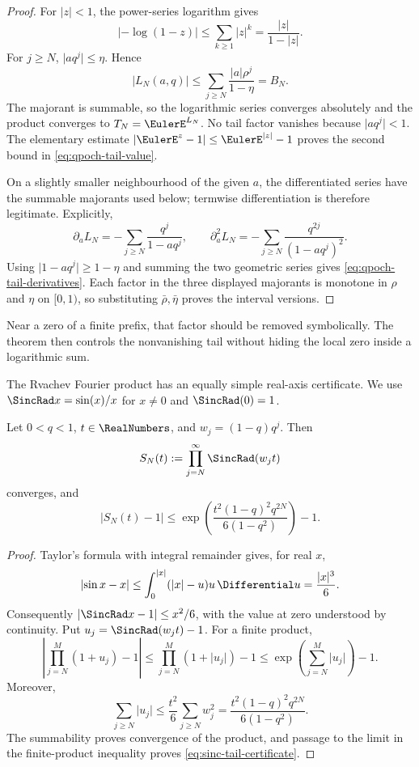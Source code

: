 \begin{proof}
For \(\lvert z\rvert<1\), the power-series logarithm gives
\[
 \left\lvert-\log(1-z)\right\rvert
 \le\sum_{k\ge1}\lvert z\rvert^k
 =\frac{\lvert z\rvert}{1-\lvert z\rvert}.
\]
For \(j\ge N\), \(\lvert aq^j\rvert\le\eta\).  Hence
\[
 \lvert L_N(a,q)\rvert
 \le \sum_{j\ge N}\frac{\lvert a\rvert\rho^j}{1-\eta}
 =B_N.
\]
The majorant is summable, so the logarithmic series converges absolutely and
the product converges to \(T_N=\EulerE^{L_N}\).  No tail factor vanishes because
\(\lvert aq^j\rvert<1\).  The elementary estimate
\(\lvert\EulerE^z-1\rvert\le\EulerE^{\lvert z\rvert}-1\) proves the second bound in
\eqref{eq:qpoch-tail-value}.

On a slightly smaller neighbourhood of the given \(a\), the differentiated
series have the summable majorants used below; termwise differentiation is
therefore legitimate.  Explicitly,
\[
 \partial_aL_N=-\sum_{j\ge N}\frac{q^j}{1-aq^j},
 \qquad
 \partial_a^2L_N=-\sum_{j\ge N}\frac{q^{2j}}{(1-aq^j)^2}.
\]
Using \(\lvert1-aq^j\rvert\ge1-\eta\) and summing the two geometric series
gives \eqref{eq:qpoch-tail-derivatives}.  Each factor in the three displayed
majorants is monotone in \(\rho\) and \(\eta\) on \([0,1)\), so substituting
\(\bar\rho,\bar\eta\) proves the interval versions.
\end{proof}

Near a zero of a finite prefix, that factor should be removed symbolically.
The theorem then controls the nonvanishing tail without hiding the local zero
inside a logarithmic sum.

The Rvachev Fourier product has an equally simple real-axis certificate.  We
use \(\SincRad x=\sin(x)/x\) for \(x\ne0\) and \(\SincRad(0)=1\).

\begin{theorem}
\label{thm:sinc-tail-certificate}
Let \(0<q<1\), \(t\in\RealNumbers\), and \(w_j=(1-q)q^j\).  Then
\[
 S_N(t):=\prod_{j=N}^{\infty}\SincRad(w_jt)
\]
converges, and
\begin{equation}
 \lvert S_N(t)-1\rvert
 \le \exp\!\left(
   \frac{t^2(1-q)^2q^{2N}}{6(1-q^2)}
 \right)-1.
 \label{eq:sinc-tail-certificate}
\end{equation}
\end{theorem}

\begin{proof}
Taylor's formula with integral remainder gives, for real \(x\),
\[
 \lvert\sin x-x\rvert
 \le\int_0^{\lvert x\rvert}(\lvert x\rvert-u)u\,\Differential u
 =\frac{\lvert x\rvert^3}{6}.
\]
Consequently \(\lvert\SincRad x-1\rvert\le x^2/6\), with the value at zero
understood by continuity.  Put \(u_j=\SincRad(w_jt)-1\).  For a finite product,
\[
 \left\lvert\prod_{j=N}^{M}(1+u_j)-1\right\rvert
 \le\prod_{j=N}^{M}(1+\lvert u_j\rvert)-1
 \le\exp\!\left(\sum_{j=N}^{M}\lvert u_j\rvert\right)-1.
\]
Moreover,
\[
 \sum_{j\ge N}\lvert u_j\rvert
 \le\frac{t^2}{6}\sum_{j\ge N}w_j^2
 =\frac{t^2(1-q)^2q^{2N}}{6(1-q^2)}.
\]
The summability proves convergence of the product, and passage to the limit in
the finite-product inequality proves \eqref{eq:sinc-tail-certificate}.
\end{proof}


